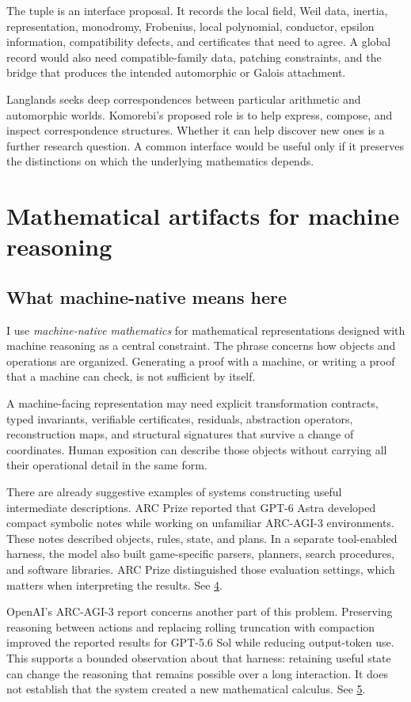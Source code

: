 \documentclass[11pt,oneside,openany]{book}
\begin{document}
The tuple is an interface proposal. It records the local field, Weil data, inertia, representation, monodromy, Frobenius, local polynomial, conductor, epsilon information, compatibility defects, and certificates that need to agree. A global record would also need compatible-family data, patching constraints, and the bridge that produces the intended automorphic or Galois attachment.

Langlands seeks deep correspondences between particular arithmetic and automorphic worlds. Komorebi's proposed role is to help express, compose, and inspect correspondence structures. Whether it can help discover new ones is a further research question. A common interface would be useful only if it preserves the distinctions on which the underlying mathematics depends.

\chapter{Mathematical artifacts for machine reasoning}
\section{What machine-native means here}
I use \emph{machine-native mathematics} for mathematical representations designed with machine reasoning as a central constraint. The phrase concerns how objects and operations are organized. Generating a proof with a machine, or writing a proof that a machine can check, is not sufficient by itself.

A machine-facing representation may need explicit transformation contracts, typed invariants, verifiable certificates, residuals, abstraction operators, reconstruction maps, and structural signatures that survive a change of coordinates. Human exposition can describe those objects without carrying all their operational detail in the same form.

There are already suggestive examples of systems constructing useful intermediate descriptions. ARC Prize reported that GPT-6 Astra developed compact symbolic notes while working on unfamiliar ARC-AGI-3 environments. These notes described objects, rules, state, and plans. In a separate tool-enabled harness, the model also built game-specific parsers, planners, search procedures, and software libraries. ARC Prize distinguished those evaluation settings, which matters when interpreting the results. See \hyperlink{reference-4}{4}.

OpenAI's ARC-AGI-3 report concerns another part of this problem. Preserving reasoning between actions and replacing rolling truncation with compaction improved the reported results for GPT-5.6 Sol while reducing output-token use. This supports a bounded observation about that harness: retaining useful state can change the reasoning that remains possible over a long interaction. It does not establish that the system created a new mathematical calculus. See \hyperlink{reference-5}{5}.
\end{document}
